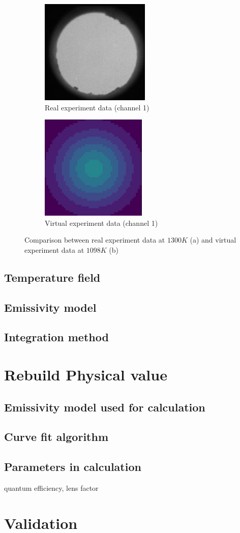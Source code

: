 \begin{figure}[htbp]
    \centering
    \begin{subfigure}{0.45\textwidth}
        \centering
        \includegraphics[height=5cm]{figures/real_camera_1075.JPG}
        \caption{Real experiment data  (channel 1)}
        \label{fig: real_camera}
    \end{subfigure}
    \begin{subfigure}{0.45\textwidth}
        \centering
        \includegraphics[height=5cm]{figures/virtual_camera_1098.jpg}
        \caption{Virtual experiment data (channel 1)}
        \label{fig: virtual_camera}
    \end{subfigure}
    \caption{Comparison between real experiment data at $1300K$ (a)
    and virtual experiment data at $1098K$ (b)
    }
    \label{fig: camera}
\end{figure}

\subsection{Temperature field}%
\subsection{Emissivity model}%
\subsection{Integration method}
\section{Rebuild Physical value}
\subsection{Emissivity model used for calculation}

\subsection{Curve fit algorithm}

\subsection{Parameters in calculation}
quantum efficiency, lens factor

\section{Validation}